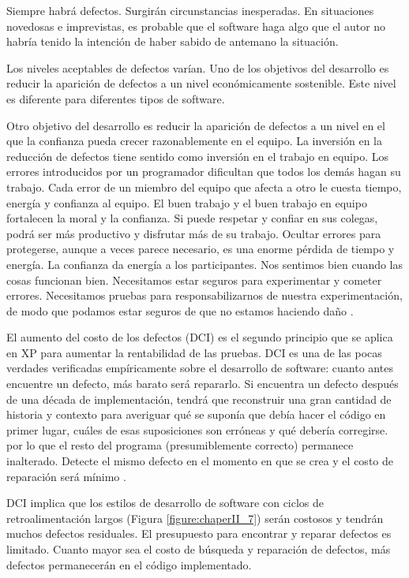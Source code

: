 \begin{spacing}{1.5}
				Siempre habrá defectos. Surgirán circunstancias inesperadas. En situaciones novedosas e imprevistas, es probable que el software haga algo que el autor no habría tenido la intención de haber sabido de antemano la situación.
				
				Los niveles aceptables de defectos varían. Uno de los objetivos del desarrollo es reducir la aparición de defectos a un nivel económicamente sostenible. Este nivel es diferente para diferentes tipos de software.
				
				Otro objetivo del desarrollo es reducir la aparición de defectos a un nivel en el que la confianza pueda crecer razonablemente en el equipo. La inversión en la reducción de defectos tiene sentido como inversión en el trabajo en equipo. Los errores introducidos por un programador dificultan que todos los demás hagan su trabajo. Cada error de un miembro del equipo que afecta a otro le cuesta tiempo, energía y confianza al equipo. El buen trabajo y el buen trabajo en equipo fortalecen la moral y la confianza. Si puede respetar y confiar en sus colegas, podrá ser más productivo y disfrutar más de su trabajo. Ocultar errores para protegerse, aunque a veces parece necesario, es una enorme pérdida de tiempo y energía. La confianza da energía a los participantes. Nos sentimos bien cuando las cosas funcionan bien. Necesitamos estar seguros para experimentar y cometer errores. Necesitamos pruebas para responsabilizarnos de nuestra experimentación, de modo que podamos estar seguros de que no estamos haciendo daño \cite{chap2_extreme_programming}.
				
				El aumento del costo de los defectos (DCI) es el segundo principio que se aplica en XP para aumentar la rentabilidad de las pruebas. DCI es una de las pocas verdades verificadas empíricamente sobre el desarrollo de software: cuanto antes encuentre un defecto, más barato será repararlo. Si encuentra un defecto después de una década de implementación, tendrá que reconstruir una gran cantidad de historia y contexto para averiguar qué se suponía que debía hacer el código en primer lugar, cuáles de esas suposiciones son erróneas y qué debería corregirse. por lo que el resto del programa (presumiblemente correcto) permanece inalterado. Detecte el mismo defecto en el momento en que se crea y el costo de reparación será mínimo \cite{chap2_extreme_programming}.
				
				DCI implica que los estilos de desarrollo de software con ciclos de retroalimentación largos (Figura \ref{figure:chaperII_7}) serán costosos y tendrán muchos defectos residuales. El presupuesto para encontrar y reparar defectos es limitado. Cuanto mayor sea el costo de búsqueda y reparación de defectos, más defectos permanecerán en el código implementado.
				

\end{spacing}
